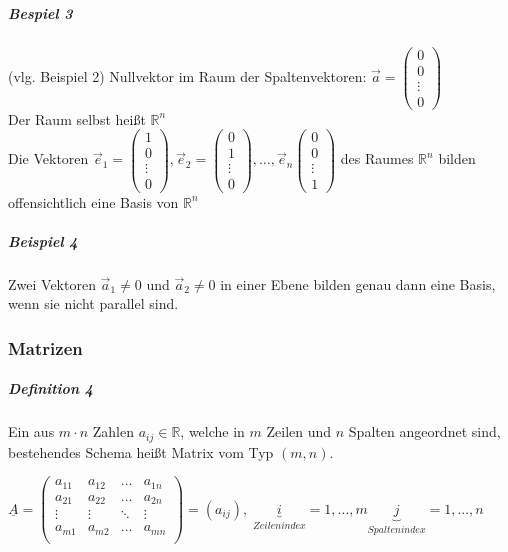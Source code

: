 \documentclass[a4paper]{scrartcl}
\begin{document}
\subparagraph{Bespiel 3} (vlg. Beispiel 2)
Nullvektor im Raum der Spaltenvektoren: $\vec{a} = \begin{pmatrix}
0\\
0\\
\vdots\\
0
\end{pmatrix}$\\
Der Raum selbst heißt $\mathbb{R}^n$\\
Die Vektoren $\vec{e}_1 = \begin{pmatrix} 1\\0\\ \vdots \\ 0\end{pmatrix}, \vec{e}_2 = \begin{pmatrix} 0\\1\\ \vdots \\ 0\end{pmatrix}, \dots , \vec{e}_n \begin{pmatrix} 0\\0\\ \vdots \\ 1\end{pmatrix}$ des Raumes $\mathbb{R}^n$ bilden offensichtlich eine Basis von $\mathbb{R}^n$
\subparagraph{Beispiel 4} Zwei Vektoren $\vec{a}_1 \neq 0 $ und $\vec{a}_2 \neq 0$ in einer Ebene bilden genau dann eine Basis, wenn sie nicht parallel sind.

\subsubsection{Matrizen}
\subparagraph{Definition 4} Ein aus $m\cdot n $ Zahlen $a_{ij} \in \mathbb{R}$, welche in $m$ Zeilen und $n$ Spalten angeordnet sind, bestehendes Schema heißt Matrix vom Typ $(m,n)$.

$\underline{A}=
\begin{pmatrix}
a_{11} & a_{12} & \dots & a_{1n}\\
a_{21} & a_{22} & \dots & a_{2n}\\
\vdots & \vdots & \ddots & \vdots\\
a_{m1} & a_{m2} & \dots & a_{mn}\\
\end{pmatrix}
=(a_{i j}), \; \underbrace{i}_{Zeilenindex}=1,...,m \underbrace{j}_{Spaltenindex}=1,...,n$
\end{document}
